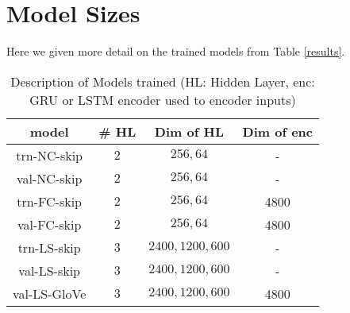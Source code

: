 \documentclass[11pt,a4paper]{article}
\begin{document}
\vspace{-4mm}












\clearpage

\appendix

\section{Model Sizes}
Here we given more detail on the trained models from Table \ref{results}.

\begin{table}[h!]
\begin{center}
\begin{tabular}{|c|c|c|c|}
\hline \bf model & \bf \# HL & \bf Dim of HL & \bf Dim of enc\\ \hline
trn-NC-skip & $2$ & $256,64$ & - \\
val-NC-skip & $2$ & $256, 64$ & -\\ \hline
trn-FC-skip & $2$ & $256, 64$ & 4800\\
val-FC-skip & $2$ & $256, 64$ & 4800\\ \hline
trn-LS-skip & $3$ & $2400, 1200, 600$ & - \\
val-LS-skip & $3$ & $2400, 1200, 600$ & - \\
val-LS-GloVe & $3$ & $2400, 1200, 600$ & 4800 \\
\hline
\end{tabular}
\end{center}
\caption{\label{details} Description of Models trained (HL: Hidden Layer, enc: GRU or LSTM encoder used to encoder inputs)}
\end{table}
\end{document}
